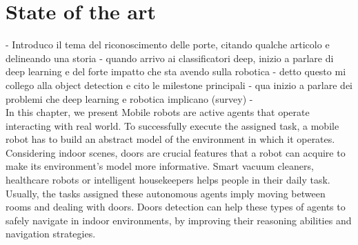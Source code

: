 \chapter{State of the art}
\label{capitolo2}
\thispagestyle{empty}

 - Introduco il tema del riconoscimento delle porte, citando qualche articolo e delineando una storia 
 - quando arrivo ai classificatori deep, inizio a parlare di deep learning e del forte impatto che sta avendo sulla robotica
 - detto questo mi collego alla object detection e cito le milestone principali 
 - qua inizio a parlare dei problemi che deep learning e robotica implicano (survey)
 - 
 \newline\\
 In this chapter, we present  
 Mobile robots are active agents that operate interacting with real world. To successfully execute the assigned task, a mobile robot has to build an abstract model of the environment in which it operates. Considering indoor scenes, doors are crucial features that a robot can acquire to make its environment's model more informative. 
 Smart vacuum cleaners, healthcare robots or intelligent housekeepers helps people in their daily task. Usually, the tasks assigned these autonomous agents imply moving between rooms and dealing with doors.
 Doors detection can help these types of agents to safely navigate in indoor environments, by improving their reasoning abilities and navigation strategies.
 
